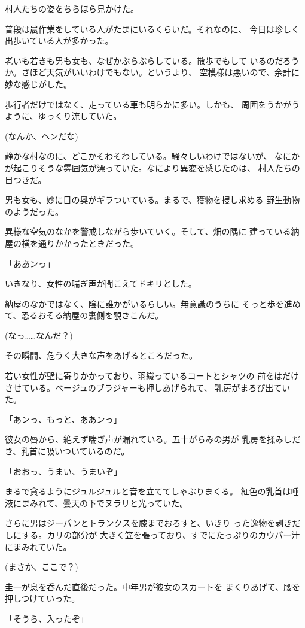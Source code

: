 ﻿\documentclass[
    book,tate,
    line_length=30zw,
    jafontsize=12pt,
    paper=b5j,
    landscape,
    ]{jlreq}
\begin{document}
村人たちの姿をちらほら見かけた。

普段は農作業をしている人がたまにいるくらいだ。それなのに、
今日は珍しく出歩いている人が多かった。

老いも若きも男も女も、なぜかぶらぶらしている。散歩でもして
いるのだろうか。さほど天気がいいわけでもない。というより、
空模様は悪いので、余計に妙な感じがした。

歩行者だけではなく、走っている車も明らかに多い。しかも、
周囲をうかがうように、ゆっくり流していた。

(なんか、ヘンだな)

静かな村なのに、どこかそわそわしている。騒々しいわけではないが、
なにかが起こりそうな雰囲気が漂っていた。なにより異変を感じたのは、
村人たちの目つきだ。

男も女も、妙に目の奥がギラついている。まるで、獲物を捜し求める
野生動物のようだった。

異様な空気のなかを警戒しながら歩いていく。そして、畑の隅に
建っている納屋の横を通りかかったときだった。

「ああンっ」

いきなり、女性の喘ぎ声が聞こえてドキリとした。

納屋のなかではなく、陰に誰かがいるらしい。無意識のうちに
そっと歩を進めて、恐るおそる納屋の裏側を覗きこんだ。

(なっ……なんだ？)

その瞬間、危うく大きな声をあげるところだった。

若い女性が壁に寄りかかっており、羽織っているコートとシャツの
前をはだけさせている。ベージュのブラジャーも押しあげられて、
乳房がまろび出ていた。

「あンっ、もっと、ああンっ」

彼女の唇から、絶えず喘ぎ声が漏れている。五十がらみの男が
乳房を揉みしだき、乳首に吸いついているのだ。

「おおっ、うまい、うまいぞ」

まるで貪るようにジュルジュルと音を立ててしゃぶりまくる。
紅色の乳首は唾液にまみれて、曇天の下でヌラリと光っていた。

さらに男はジーパンとトランクスを膝までおろすと、いきり
った逸物を剥きだしにする。カリの部分が
大きく笠を張っており、すでにたっぷりのカウパー汁にまみれていた。

(まさか、ここで？)

圭一が息を呑んだ直後だった。中年男が彼女のスカートを
まくりあげて、腰を押しつけていった。

「そうら、入ったぞ」
\end{document}
